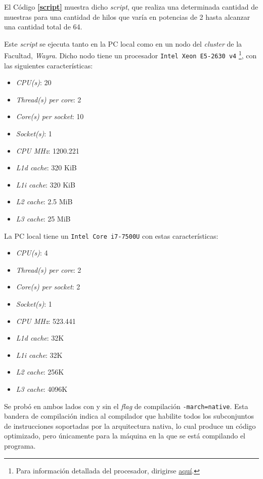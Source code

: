 \documentclass[12pt,a4paper]{article}
\begin{document}
El Código \textbf{\ref{script}} muestra dicho \emph{script}, que realiza una
determinada cantidad de muestras para una cantidad de hilos que varía en
potencias de 2 hasta alcanzar una cantidad total de 64.

Este \emph{script} se ejecuta tanto en la PC local como en un nodo del
\emph{cluster} de la Facultad, \emph{Wayra}.
Dicho nodo tiene un procesador \verb|Intel Xeon E5-2630 v4|
\footnote{Para información detallada del procesador, dirigirse
\href{https://ark.intel.com/content/www/es/es/ark/products/92981/intel-xeon-processor-e5-2630-v4-25m-cache-2-20-ghz.html}
{aquí}.}, con las siguientes características:

\begin{itemize}[leftmargin=1.5cm, itemsep=1pt]
  \item \emph{CPU(s)}: 20
  \item \emph{Thread(s) per core}: 2
  \item \emph{Core(s) per socket}: 10
  \item \emph{Socket(s)}: 1
  \item \emph{CPU MHz}: 1200.221
  \item \emph{L1d cache}: 320 KiB
  \item \emph{L1i cache}: 320 KiB
  \item \emph{L2 cache}: 2.5 MiB
  \item \emph{L3 cache}: 25 MiB
\end{itemize}

La PC local tiene un \verb|Intel Core i7-7500U| con estas características:

\begin{itemize}[leftmargin=1.5cm, itemsep=1pt]
  \item \emph{CPU(s)}: 4
  \item \emph{Thread(s) per core}: 2
  \item \emph{Core(s) per socket}: 2
  \item \emph{Socket(s)}: 1
  \item \emph{CPU MHz}: 523.441
  \item \emph{L1d cache}: 32K
  \item \emph{L1i cache}: 32K
  \item \emph{L2 cache}: 256K
  \item \emph{L3 cache}: 4096K
\end{itemize}

Se probó en ambos lados con y sin el \emph{flag} de compilación \verb|-march=native|.
Esta bandera de compilación indica al compilador que habilite todos los
subconjuntos de instrucciones soportadas por la arquitectura nativa, lo cual
produce un código optimizado, pero únicamente para la máquina en la que se está
compilando el programa.
\end{document}
